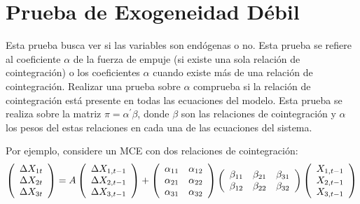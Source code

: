 \section{Prueba de Exogeneidad D\'{e}bil}
Esta prueba busca ver si las variables son end\'{o}genas o no. Esta prueba se refiere al coeficiente $\alpha $ de la fuerza de empuje (si existe una sola relaci\'{o}n de cointegraci\'{o}n) o los coeficientes $\alpha $ cuando existe m\'{a}s de una relaci\'{o}n de cointegraci\'{o}n. Realizar una prueba sobre $\alpha $ comprueba si la relaci\'{o}n de cointegraci\'{o}n est\'{a} presente en todas las ecuaciones del modelo. Esta prueba se realiza sobre la matriz $\pi =\alpha^{'}\beta $, donde $\beta $ son las relaciones de cointegraci\'{o}n y $\alpha $ los pesos del estas relaciones en cada una de las ecuaciones del sistema.\newline

Por ejemplo, considere un MCE con dos relaciones de cointegraci\'{o}n:
\[
\left( {\begin{array}{*{20}c}
\Delta X_{1t}\\
\Delta X_{2t}\\
\Delta X_{3t}\\
\end{array} } \right)=A\left( {\begin{array}{*{20}c}
\Delta X_{1,t-1}\\
\Delta X_{2,t-1}\\
\Delta X_{3,t-1}\\
\end{array} } \right)+\left( {\begin{array}{*{20}c}
\alpha_{11} & \alpha_{12}\\
\alpha_{21} & \alpha_{22}\\
\alpha_{31} & \alpha_{32}\\
\end{array} } \right)\left( {\begin{array}{*{20}c}
\beta_{11} & \beta_{21} & \beta_{31}\\
\beta_{12} & \beta_{22} & \beta_{32}\\
\end{array} } \right)\left( {\begin{array}{*{20}c}
X_{1,t-1}\\
X_{2,t-1}\\
X_{3,t-1}\\
\end{array} } \right)
\]

